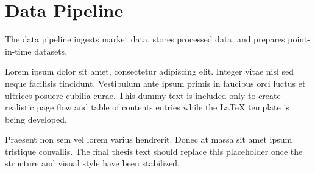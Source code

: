 \section{Data Pipeline}

The data pipeline ingests market data, stores processed data, and prepares point-in-time datasets.

Lorem ipsum dolor sit amet, consectetur adipiscing elit. Integer vitae nisl sed neque facilisis tincidunt. Vestibulum ante ipsum primis in faucibus orci luctus et ultrices posuere cubilia curae. This dummy text is included only to create realistic page flow and table of contents entries while the LaTeX template is being developed.

Praesent non sem vel lorem varius hendrerit. Donec at massa sit amet ipsum tristique convallis. The final thesis text should replace this placeholder once the structure and visual style have been stabilized.

